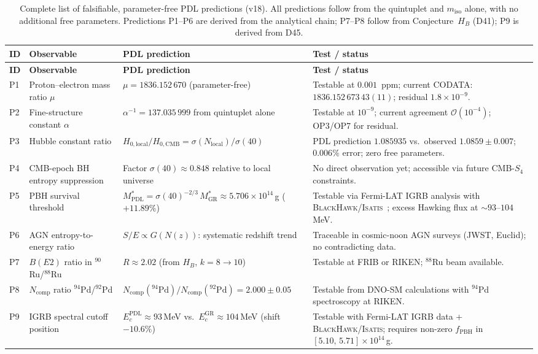 \documentclass[11pt,a4paper]{article}
\theoremstyle{plain}
\theoremstyle{definition}
\theoremstyle{remark}
\begin{document}
\begin{longtable}{L{0.5cm}L{3.2cm}L{5.2cm}L{4.2cm}}
\caption{Complete list of falsifiable, parameter-free PDL predictions (v18). All predictions follow from the quintuplet and $m_{\mathrm{iso}}$ alone, with no additional free parameters. Predictions P1--P6 are derived from the analytical chain; P7--P8 follow from Conjecture~$H_B$ (D41); P9 is derived from D45.}
\label{tab:predictions}\\
\toprule
\textbf{ID} & \textbf{Observable} & \textbf{PDL prediction} & \textbf{Test / status}\\
\midrule
\endfirsthead
\toprule
\textbf{ID} & \textbf{Observable} & \textbf{PDL prediction} & \textbf{Test / status}\\
\midrule
\endhead
\bottomrule
\endfoot
P1 & Proton--electron mass ratio $\mu$ & $\mu=1836.152\,670$ (parameter-free) & Testable at $0.001$~ppm; current CODATA: $1836.152\,673\,43(11)$; residual $1.8\times10^{-9}$.\\[0.4em]
P2 & Fine-structure constant $\alpha$ & $\alpha^{-1}=137.035\,999$ from quintuplet alone & Testable at $10^{-9}$; current agreement $\mathcal{O}(10^{-4})$; OP3/OP7 for residual.\\[0.4em]
P3 & Hubble constant ratio & $H_{0,\mathrm{local}}/H_{0,\mathrm{CMB}}=\sigma(N_{\mathrm{local}})/\sigma(40)$ & PDL prediction $1.085935$ vs.\ observed $1.0859\pm0.007$; $0.006\%$ error; zero free parameters.\\[0.4em]
P4 & CMB-epoch BH entropy suppression & Factor $\sigma(40)\approx 0.848$ relative to local universe & No direct observation yet; accessible via future CMB-$S_4$ constraints.\\[0.4em]
P5 & PBH survival threshold & $M^*_{\mathrm{PDL}}=\sigma(40)^{-2/3}\,M^*_{\mathrm{GR}}\approx 5.706\times10^{14}$\,g ($+11.89\%$) & Testable via Fermi-LAT IGRB analysis with \textsc{BlackHawk}/\textsc{Isatis}~\cite{D45}; excess Hawking flux at $\sim93$--$104$\,MeV.\\[0.4em]
P6 & AGN entropy-to-energy ratio & $S/E\propto G(N(z))$: systematic redshift trend & Traceable in cosmic-noon AGN surveys (JWST, Euclid); no contradicting data.\\[0.4em]
P7 & $B(E2)$ ratio in $^{90}$Ru/$^{88}$Ru & $R\approx 2.02$ (from $H_B$, $k=8\to10$) & Testable at FRIB or RIKEN; $^{88}$Ru beam available.\\[0.4em]
P8 & $N_{\mathrm{comp}}$ ratio $^{94}$Pd/$^{92}$Pd & $N_{\mathrm{comp}}(^{94}\mathrm{Pd})/N_{\mathrm{comp}}(^{92}\mathrm{Pd})=2.000\pm0.05$ & Testable from DNO-SM calculations with $^{94}$Pd spectroscopy at RIKEN.\\[0.4em]
P9 & IGRB spectral cutoff position & $E_c^{\mathrm{PDL}} \approx 93$\,MeV vs.\ $E_c^{\mathrm{GR}} \approx 104$\,MeV (shift $-10.6\%$) & Testable with Fermi-LAT IGRB data + \textsc{BlackHawk}/\textsc{Isatis}; requires non-zero $f_{\mathrm{PBH}}$ in $[5.10,\,5.71]\times10^{14}$\,g.\\[0.4em]
\end{longtable}
\end{document}
